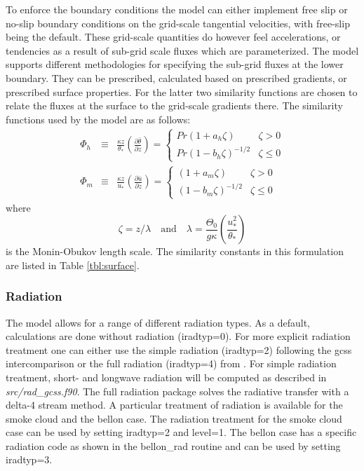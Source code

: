 \documentclass[11pt,a4paper]{article}
\begin{document}
To enforce the boundary conditions the model can either implement free
slip or no-slip boundary conditions on the grid-scale tangential
velocities, with free-slip being the default.  These grid-scale
quantities do however feel accelerations, or tendencies as a result of
sub-grid scale fluxes which are parameterized.  The model supports
different methodologies for specifying the sub-grid fluxes at the
lower boundary.  They can be prescribed, calculated based on
prescribed gradients, or prescribed surface properties.  For the
latter two similarity functions are chosen to relate the fluxes at the
surface to the grid-scale gradients there.  The similarity functions
used by the model are as follows:
\begin{eqnarray*}
\Phi_h & \equiv &\frac{\kappa z}{\theta_*} \left(\frac{\partial
\bar{\theta}}{\partial z}\right) = \begin{cases} Pr(1+a_h\zeta) &
\zeta > 0 \\ Pr(1-b_h\zeta)^{-1/2} & \zeta \le 0 \end{cases} \\ \Phi_m
& \equiv & \frac{\kappa z}{u_*} \left( \frac{\partial
\bar{u}}{\partial z} \right) = \begin{cases} (1+a_m\zeta) & \zeta > 0
\\ (1-b_m\zeta)^{-1/2} & \zeta \le 0 \end{cases}
\end{eqnarray*}
where
\[ \zeta = z/\lambda \quad \text{and} \quad \lambda =
\frac{\Theta_0}{g\kappa} \left(\frac{u_*^2}{\theta_*}\right) \] is the
Monin-Obukov length scale.  The similarity constants in this
formulation are listed in Table \ref{tbl:surface}.

\subsubsection{Radiation}
The model allows for a range of different radiation types.
As a default, calculations are done without
radiation (iradtyp=0). For more explicit radiation treatment one can either use
the simple radiation (iradtyp=2) following the gcss intercomparison or
the full radiation (iradtyp=4) from \cite{Pincus:2009}.
For simple radiation treatment, short- and longwave
radiation will be computed as described in \emph{src/rad\_gcss.f90}.
The full radiation package solves the radiative transfer with a delta-4 stream method.
A particular treatment
of radiation is available for the smoke cloud and the bellon
case. The radiation treatment for the smoke cloud case can be
used by setting iradtyp=2 and level=1. The bellon case has a
specific radiation code as shown in the bellon\_rad routine
and can be used by setting iradtyp=3.
\end{document}
